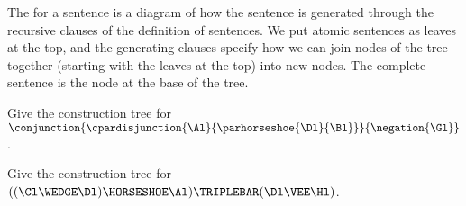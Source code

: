 \begin{majorILnc}{}
The  for a sentence is a diagram of how the sentence is generated through the recursive clauses of the definition of \GSL{} sentences. We put atomic sentences as leaves at the top, and the generating clauses specify how we can join nodes of the tree together (starting with the leaves at the top) into new nodes. The complete sentence is the node at the base of the tree. 
\end{majorILnc}
\begin{majorILnc}{}
Give the construction tree for $\conjunction{\cpardisjunction{\Al}{\parhorseshoe{\Dl}{\Bl}}}{\negation{\Gl}}$.
\begin{center}
\end{center}
\end{majorILnc}
\begin{majorILnc}{}
Give the construction tree for $((\Cl \WEDGE \Dl) \HORSESHOE \Al)\TRIPLEBAR (\Dl \VEE \Hl)$.
\begin{center}
\end{center}
\end{majorILnc}
